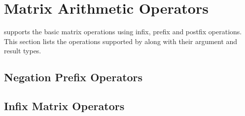 \section{Matrix Arithmetic Operators}

\Stan supports the basic matrix operations using infix, prefix and
postfix operations.  This section lists the operations supported by
\Stan along with their argument and result types.

\subsection{Negation Prefix Operators}

\begin{description}
%
%
%
%
\end{description}


\subsection{Infix Matrix Operators}

